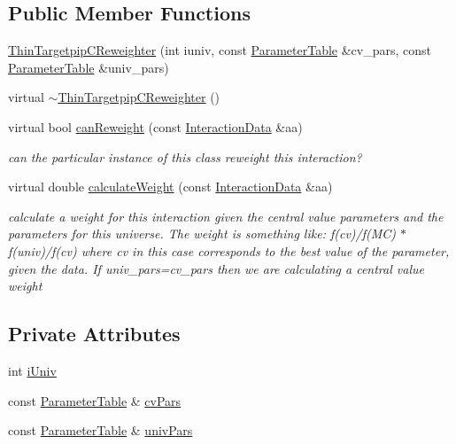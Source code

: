 \subsection*{Public Member Functions}
\begin{DoxyCompactItemize}
\item 
\hyperlink{class_neutrino_flux_reweight_1_1_thin_targetpip_c_reweighter_ada13aac28762c55f4c58fd40e893ca40}{Thin\-Targetpip\-C\-Reweighter} (int iuniv, const \hyperlink{class_neutrino_flux_reweight_1_1_parameter_table}{Parameter\-Table} \&cv\-\_\-pars, const \hyperlink{class_neutrino_flux_reweight_1_1_parameter_table}{Parameter\-Table} \&univ\-\_\-pars)
\item 
virtual \hyperlink{class_neutrino_flux_reweight_1_1_thin_targetpip_c_reweighter_a28cc620d0c0d6b363590ee270e81a3f5}{$\sim$\-Thin\-Targetpip\-C\-Reweighter} ()
\item 
virtual bool \hyperlink{class_neutrino_flux_reweight_1_1_thin_targetpip_c_reweighter_a85dfb364850ec5af9b58cdff4c37c678}{can\-Reweight} (const \hyperlink{class_neutrino_flux_reweight_1_1_interaction_data}{Interaction\-Data} \&aa)
\begin{DoxyCompactList}\small\item\em can the particular instance of this class reweight this interaction? \end{DoxyCompactList}\item 
virtual double \hyperlink{class_neutrino_flux_reweight_1_1_thin_targetpip_c_reweighter_a6941429f810ddcc72aa979e829da3314}{calculate\-Weight} (const \hyperlink{class_neutrino_flux_reweight_1_1_interaction_data}{Interaction\-Data} \&aa)
\begin{DoxyCompactList}\small\item\em calculate a weight for this interaction given the central value parameters and the parameters for this universe. The weight is something like\-: f(cv)/f(M\-C) $\ast$ f(univ)/f(cv) where cv in this case corresponds to the best value of the parameter, given the data. If univ\-\_\-pars=cv\-\_\-pars then we are calculating a central value weight \end{DoxyCompactList}\end{DoxyCompactItemize}
\subsection*{Private Attributes}
\begin{DoxyCompactItemize}
\item 
int \hyperlink{class_neutrino_flux_reweight_1_1_thin_targetpip_c_reweighter_a97d91aff2a76990d435c1534a7d29dca}{i\-Univ}
\item 
const \hyperlink{class_neutrino_flux_reweight_1_1_parameter_table}{Parameter\-Table} \& \hyperlink{class_neutrino_flux_reweight_1_1_thin_targetpip_c_reweighter_af5d2120c06647661015daae96c40f130}{cv\-Pars}
\item 
const \hyperlink{class_neutrino_flux_reweight_1_1_parameter_table}{Parameter\-Table} \& \hyperlink{class_neutrino_flux_reweight_1_1_thin_targetpip_c_reweighter_a5fb560293bea225254092a20c2261008}{univ\-Pars}
\end{DoxyCompactItemize}


